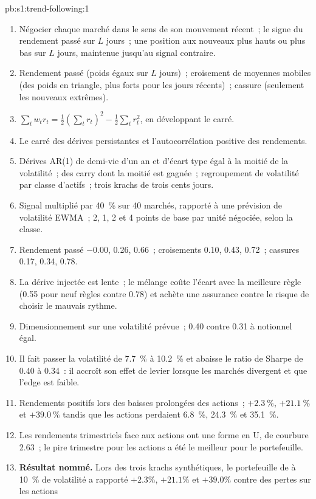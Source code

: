 \begin{solution}{pb:s1:trend-following:1}
\begin{enumerate}
\item Négocier chaque marché dans le sens de son mouvement récent~; le signe du rendement passé sur $L$ jours~; une position aux nouveaux plus hauts ou plus bas sur $L$ jours, maintenue
jusqu'au signal contraire.
\item Rendement passé (poids égaux sur $L$ jours)~; croisement de moyennes mobiles (des poids en triangle, plus forts pour les jours récents)~; cassure (seulement les nouveaux extrêmes).
\item $\sum_t w_t r_t = \tfrac12(\sum_t r_t)^2 - \tfrac12\sum_t r_t^2$, en développant le carré.
\item Le carré des dérives persistantes et l'autocorrélation positive des rendements.
\item Dérives AR(1) de demi-vie d'un an et d'écart type égal à la moitié de la volatilité~; des carry dont la moitié est gagnée~; regroupement de volatilité par
classe d'actifs~; trois krachs de trois cents jours.
\item Signal multiplié par 40~\% sur 40 marchés, rapporté à une prévision de volatilité EWMA~; 2, 1, 2 et 4 points de base par unité négociée, selon la classe.
\item Rendement passé $-0.00$, 0.26, 0.66~; croisements 0.10, 0.43, 0.72~; cassures 0.17, 0.34, 0.78.
\item La dérive injectée est lente~; le mélange coûte l'écart avec la meilleure règle (0.55 pour neuf règles contre 0.78) et achète une assurance contre
le risque de choisir le mauvais rythme.
\item Dimensionnement sur une volatilité prévue~; 0.40 contre 0.31 à notionnel égal.
\item Il fait passer la volatilité de 7.7~\% à 10.2~\% et abaisse le ratio de Sharpe de 0.40 à 0.34~: il accroît son effet de levier lorsque les marchés divergent et que l'edge est faible.
\item Rendements positifs lors des baisses prolongées des actions~; $+2.3~\%$, $+21.1~\%$ et $+39.0~\%$ tandis que les actions perdaient 6.8~\%, 24.3~\% et 35.1~\%.
\item Les rendements trimestriels face aux actions ont une forme en U, de courbure 2.63~; le pire trimestre pour les actions a été le meilleur pour le portefeuille.
\item \textbf{Résultat nommé.} Lors des trois krachs synthétiques, le portefeuille de  à 10~\% de volatilité a rapporté $+2.3\%$, $+21.1\%$ et $+39.0\%$ contre des pertes sur les actions

\end{enumerate}
\end{solution}
